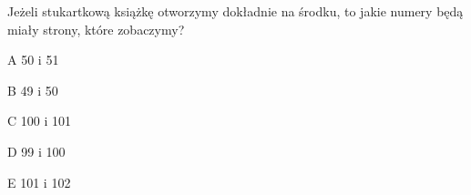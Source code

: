 \begin{tresc}
Jeżeli stukartkową książkę otworzymy dokładnie na środku, to jakie numery będą miały strony, które zobaczymy?
\end{tresc}
\begin{wariant}{A} 50 i 51 \end{wariant}
\begin{wariant}{B} 49 i 50 \end{wariant}
\begin{wariant}{C} 100 i 101 \end{wariant}
\begin{wariant}{D} 99 i 100 \end{wariant}
\begin{wariant}{E} 101 i 102 \end{wariant}
